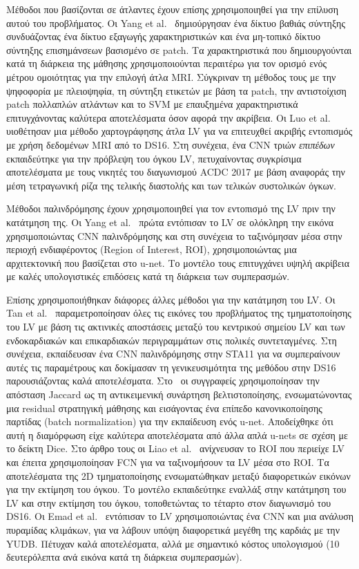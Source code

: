 Μέθοδοι που βασίζονται σε άτλαντες έχουν επίσης χρησιμοποιηθεί για την επίλυση αυτού του προβλήματος.
Οι Yang et al.~\cite{yang2016deep} δημιούργησαν ένα δίκτυο βαθιάς σύντηξης συνδυάζοντας ένα δίκτυο εξαγωγής χαρακτηριστικών και ένα μη-τοπικό δίκτυο σύντηξης επισημάνσεων βασισμένο σε patch.
Τα χαρακτηριστικά που δημιουργούνται κατά τη διάρκεια της μάθησης χρησιμοποιούνται περαιτέρω για τον ορισμό ενός μέτρου ομοιότητας για την επιλογή άτλα MRI\@.
Σύγκριναν τη μέθοδος τους με την ψηφοφορία με πλειοψηφία, τη σύντηξη ετικετών με βάση τα patch, την αντιστοίχιση patch πολλαπλών ατλάντων και το SVM με επαυξημένα χαρακτηριστικά επιτυγχάνοντας καλύτερα αποτελέσματα όσον αφορά την ακρίβεια.
Οι Luo et al.~\cite{luo2016cardiac} υιοθέτησαν μια μέθοδο χαρτογράφησης άτλα LV για να επιτευχθεί ακριβής εντοπισμός με χρήση δεδομένων MRI από το DS16.
Στη συνέχεια, ένα CNN τριών \textit{επιπέδων} εκπαιδεύτηκε για την πρόβλεψη του όγκου LV, πετυχαίνοντας συγκρίσιμα αποτελέσματα με τους νικητές του διαγωνισμού ACDC 2017 με βάση αναφοράς την μέση τετραγωνική ρίζα της τελικής διαστολής και των τελικών συστολικών όγκων.

Μέθοδοι παλινδρόμησης έχουν χρησιμοποιηθεί για τον εντοπισμό της LV πριν την κατάτμηση της.
Οι Yang et al.~\cite{yang2017deep} πρώτα εντόπισαν το LV σε ολόκληρη την εικόνα χρησιμοποιώντας CNN παλινδρόμησης και στη συνέχεια το ταξινόμησαν μέσα στην περιοχή ενδιαφέροντος (Region of Interest, ROI), χρησιμοποιώντας μια αρχιτεκτονική που βασίζεται στο u-net.
Το μοντέλο τους επιτυγχάνει υψηλή ακρίβεια με καλές υπολογιστικές επιδόσεις κατά τη διάρκεια των συμπερασμών.

Επίσης χρησιμοποιήθηκαν διάφορες άλλες μέθοδοι για την κατάτμηση του LV\@.
Οι Tan et al.~\cite{tan2017convolutional} παραμετροποίησαν όλες τις εικόνες του προβλήματος της τμηματοποίησης του LV με βάση τις ακτινικές αποστάσεις μεταξύ του κεντρικού σημείου LV και των ενδοκαρδιακών και επικαρδιακών περιγραμμάτων στις πολικές συντεταγμένες.
Στη συνέχεια, εκπαίδευσαν ένα CNN παλινδρόμησης στην STA11 για να συμπεραίνουν αυτές τις παραμέτρους και δοκίμασαν τη γενικευσιμότητα της μεθόδου στην DS16 παρουσιάζοντας καλά αποτελέσματα.
Στο~\cite{curiale2017automatic} οι συγγραφείς χρησιμοποίησαν την απόσταση Jaccard ως τη αντικειμενική συνάρτηση βελτιστοποίησης, ενσωματώνοντας μια residual στρατηγική μάθησης και εισάγοντας ένα επίπεδο κανονικοποίησης παρτίδας (batch normalization) για την εκπαίδευση ενός u-net.
Αποδείχθηκε ότι αυτή η διαμόρφωση είχε καλύτερα αποτελέσματα από άλλα απλά u-nets σε σχέση με το δείκτη Dice.
Στο άρθρο τους οι Liao et al.~\cite{liao2017estimation} ανίχνευσαν το ROI που περιείχε LV και έπειτα χρησιμοποίησαν FCN για να ταξινομήσουν τα LV μέσα στο ROI\@.
Τα αποτελέσματα της 2D τμηματοποίησης ενσωματώθηκαν μεταξύ διαφορετικών εικόνων για την εκτίμηση του όγκου.
Το μοντέλο εκπαιδεύτηκε εναλλάξ στην κατάτμηση του LV και στην εκτίμηση του όγκου, τοποθετώντας το τέταρτο στον διαγωνισμό του DS16.
Οι Emad et al.~\cite{emad2015automatic} εντόπισαν το LV χρησιμοποιώντας ένα CNN και μια ανάλυση πυραμίδας κλιμάκων, για να λάβουν υπόψη διαφορετικά μεγέθη της καρδιάς με την YUDB\@.
Πέτυχαν καλά αποτελέσματα, αλλά με σημαντικό κόστος υπολογισμού (10 δευτερόλεπτα ανά εικόνα κατά τη διάρκεια συμπερασμών).

